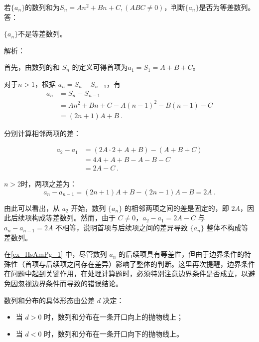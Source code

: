 \begin{example}{若$\{a_n\}$的数列和为$S_n=An^2+Bn+C,(ABC\neq0)$，判断$\{a_n\}$是否为等差数列。}\label{ex_HsAmPg_1}
答：

$\{a_n\}$不是等差数列。

解析：

首先，由数列的和 $S_n$ 的定义可得首项为$a_1=S_1=A+B+C$。

对于$n>1$，根据 $a_n = S_n - S_{n-1}$，有
\begin{equation}
\begin{split}
a_n &= S_n-S_{n-1}\\
&=An^2+Bn+C-A(n-1)^2-B(n-1)-C\\
&=(2n+1)A+B~.
\end{split}
\end{equation}

分别计算相邻两项的差：

\begin{equation}
\begin{split}
a_2 - a_1 &= (2A \cdot 2 + A + B) - (A + B + C) \\
&= 4A + A + B - A - B - C \\
&= 2A - C~.
\end{split}
\end{equation}

$n>2$时，两项之差为：
\begin{equation}
a_n-a_{n-1} = (2n+1)A+B-(2n-1)A-B=2A~.
\end{equation}

由此可以看出，从 $a_2$ 开始，数列 $\{a_n\}$ 的相邻两项之间的差是固定的，即 $2A$，因此后续项构成等差数列。然而，由于 $C \neq 0$，$a_2 - a_1 = 2A - C$ 与 $a_n - a_{n-1} = 2A$ 不相等，说明首项与后续项之间的差异导致 $\{a_n\}$ 整体不构成等差数列。

\end{example}

在\autoref{ex_HsAmPg_1} 中，尽管数列 ${a_n}$ 的后续项具有等差性，但由于边界条件的特殊性（首项与后续项之间存在差异）影响了整体的判断。这里再次提醒，边界条件在问题中起到关键作用，在处理计算题时，必须特别注意边界条件是否成立，以避免因忽视边界条件而导致的错误结论。

数列和分布的具体形态由公差 $d$ 决定：
\begin{itemize}
\item 当 $d > 0$ 时，数列和分布在一条开口向上的抛物线上；
\item 当 $d < 0$ 时，数列和分布在一条开口向下的抛物线上。
\end{itemize}

